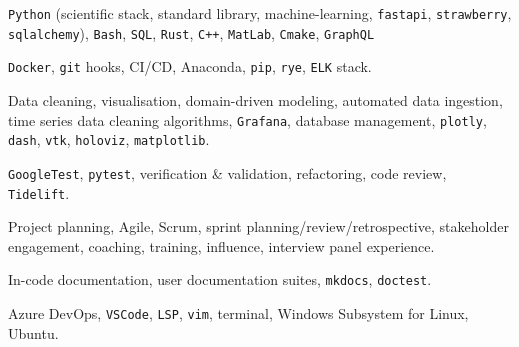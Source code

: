 \documentclass[8pt]{developercv}
\begin{document}
\begin{entrylist}
	{
		\texttt{Python} (scientific stack, standard library, machine-learning,
		\texttt{fastapi}, \texttt{strawberry}, \texttt{sqlalchemy}), \texttt{Bash},
		\texttt{SQL}, \texttt{Rust}, \texttt{C++}, \texttt{MatLab}, \texttt{Cmake},
		\texttt{GraphQL}
	}

	{
		\texttt{Docker}, \texttt{git} hooks, CI/CD, Anaconda, \texttt{pip},
		\texttt{rye}, \texttt{ELK} stack.
	}

	{
		Data cleaning, visualisation, domain-driven modeling, automated data
		ingestion, time series data cleaning algorithms, \texttt{Grafana}, database
		management, \texttt{plotly}, \texttt{dash}, \texttt{vtk}, \texttt{holoviz},
		\texttt{matplotlib}.
	}

	{
		\texttt{GoogleTest}, \texttt{pytest}, verification \& validation,
		refactoring, code review, \texttt{Tidelift}.
	}

	{
		Project planning, Agile, Scrum, sprint planning/review/retrospective,
		stakeholder engagement, coaching, training, influence, interview panel
		experience.
	}

	{
		In-code documentation, user documentation suites, \texttt{mkdocs},
		\texttt{doctest}.
	}

	{
		Azure DevOps, \texttt{VSCode}, \texttt{LSP}, \texttt{vim}, terminal,
		Windows Subsystem for Linux, Ubuntu.
	}

\end{entrylist}

\end{document}
